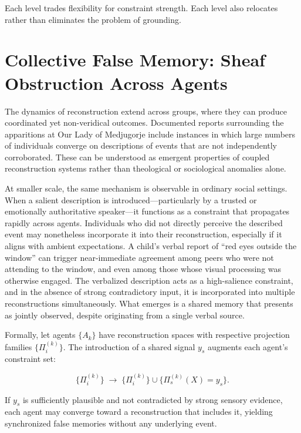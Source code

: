 \documentclass[12pt, letterpaper]{article}
\theoremstyle{flyxion}
\begin{document}
Each level trades flexibility for constraint strength. Each level also relocates rather than eliminates the problem of grounding.

\section{Collective False Memory: Sheaf Obstruction Across Agents}

The dynamics of reconstruction extend across groups, where they can produce coordinated yet non-veridical outcomes. Documented reports surrounding the apparitions at Our Lady of Medjugorje include instances in which large numbers of individuals converge on descriptions of events that are not independently corroborated. These can be understood as emergent properties of coupled reconstruction systems rather than theological or sociological anomalies alone.

At smaller scale, the same mechanism is observable in ordinary social settings. When a salient description is introduced---particularly by a trusted or emotionally authoritative speaker---it functions as a constraint that propagates rapidly across agents. Individuals who did not directly perceive the described event may nonetheless incorporate it into their reconstruction, especially if it aligns with ambient expectations. A child's verbal report of ``red eyes outside the window'' can trigger near-immediate agreement among peers who were not attending to the window, and even among those whose visual processing was otherwise engaged. The verbalized description acts as a high-salience constraint, and in the absence of strong contradictory input, it is incorporated into multiple reconstructions simultaneously. What emerges is a shared memory that presents as jointly observed, despite originating from a single verbal source.

Formally, let agents $\{A_k\}$ have reconstruction spaces with respective projection families $\{\Pi_i^{(k)}\}$. The introduction of a shared signal $y_s$ augments each agent's constraint set:

\begin{equation}
\{\Pi_i^{(k)}\} \;\to\; \{\Pi_i^{(k)}\} \cup \{\Pi_s^{(k)}(X) = y_s\}.
\end{equation}

If $y_s$ is sufficiently plausible and not contradicted by strong sensory evidence, each agent may converge toward a reconstruction that includes it, yielding synchronized false memories without any underlying event.
\end{document}
